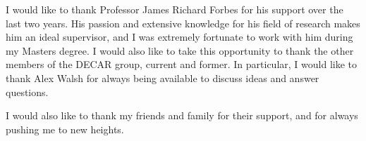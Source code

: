 I would like to thank Professor James Richard Forbes for his support over the last two years. His passion and extensive knowledge for his field of research makes him an ideal supervisor, and I was extremely fortunate to work with him during my Masters degree. I would also like to take this opportunity to thank the other members of the DECAR group, current and former. In particular, I would like to thank Alex Walsh for always being available to discuss ideas and answer questions.

I would also like to thank my friends and family for their support, and for always pushing me to new heights.